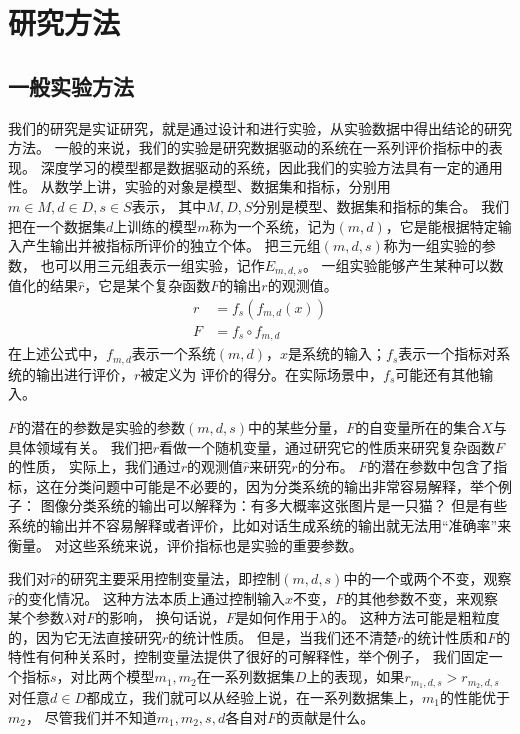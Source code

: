 
\chapter{研究方法}\label{ch:研究方法}

\section{一般实验方法}\label{sec:general_experiment_method}
我们的研究是实证研究，就是通过设计和进行实验，从实验数据中得出结论的研究方法。
一般的来说，我们的实验是研究数据驱动的系统在一系列评价指标中的表现。
深度学习的模型都是数据驱动的系统，因此我们的实验方法具有一定的通用性。
从数学上讲，实验的对象是模型、数据集和指标，分别用$m\in M, d\in D, s\in S$表示，
其中$M, D, S$分别是模型、数据集和指标的集合。
我们把在一个数据集$d$上训练的模型$m$称为一个系统，记为$(m, d)$，它是能根据特定输入产生输出并被指标所评价的独立个体。
把三元组$(m, d, s)$称为一组实验的参数， 也可以用三元组表示一组实验，记作$E_{m, d, s}$。
一组实验能够产生某种可以数值化的结果$\hat{r}$，它是某个复杂函数$\mathit{F}$的输出$r$的观测值。
\begin{align}
    r &= f_s\left( f_{m, d}(x) \right) \\
    \mathit{F} &= f_s \circ f_{m, d}
\end{align}
在上述公式中，$f_{m, d}$表示一个系统$(m, d)$，$x$是系统的输入；$f_s$表示一个指标对系统的输出进行评价，$r$被定义为
评价的得分。在实际场景中，$f_s$可能还有其他输入。

$\mathit{F}$的潜在的参数是实验的参数$(m, d, s)$中的某些分量，$\mathit{F}$的自变量所在的集合$X$与具体领域有关。
我们把$r$看做一个随机变量，通过研究它的性质来研究复杂函数$\mathit{F}$的性质，
实际上，我们通过$r$的观测值$\hat{r}$来研究$r$的分布。
$\mathit{F}$的潜在参数中包含了指标，这在分类问题中可能是不必要的，因为分类系统的输出非常容易解释，举个例子：
图像分类系统的输出可以解释为：有多大概率这张图片是一只猫？
但是有些系统的输出并不容易解释或者评价，比如对话生成系统的输出就无法用“准确率”来衡量。
对这些系统来说，评价指标也是实验的重要参数。

我们对$\hat{r}$的研究主要采用控制变量法，即控制$(m, d, s)$中的一个或两个不变，观察$\hat{r}$的变化情况。
这种方法本质上通过控制输入$x$不变，$\mathit{F}$的其他参数不变，来观察某个参数$\lambda$对$\mathit{F}$的影响，
换句话说，$\mathit{F}$是如何作用于$\lambda$的。
这种方法可能是粗粒度的，因为它无法直接研究$r$的统计性质。
但是，当我们还不清楚$r$的统计性质和$\mathit{F}$的特性有何种关系时，控制变量法提供了很好的可解释性，举个例子，
我们固定一个指标$s$，对比两个模型$m_1, m_2$在一系列数据集$D$上的表现，如果$r_{m_1, d, s} > r_{m_2, d, s}$
对任意$d\in D$都成立，我们就可以从经验上说，在一系列数据集上，$m_1$的性能优于$m_2$，
尽管我们并不知道$m_1, m_2, s, d$各自对$\mathit{F}$的贡献是什么。


